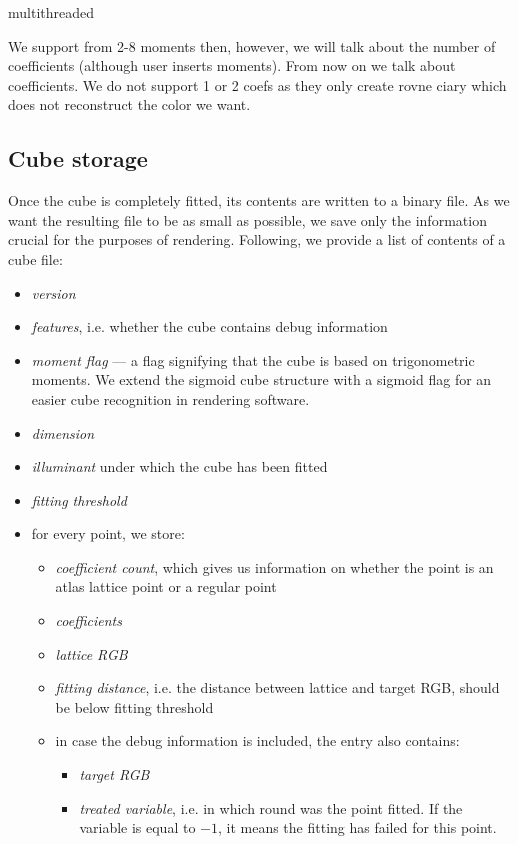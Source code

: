 multithreaded 

We support from 2-8 moments then, however, we will talk about the number of coefficients (although user inserts moments). From now on we talk about coefficients. We do not support 1 or 2 coefs as they only create rovne ciary which does not reconstruct the color we want.

\subsection{Cube storage}
	
Once the cube is completely fitted, its contents are written to a binary file. As we want the resulting file to be as small as possible, we save only the information crucial for the purposes of rendering. Following, we provide a list of contents of a cube file:
\begin{itemize}
	\item \emph{version}
	\item \emph{features}, i.e. whether the cube contains debug information
	\item \emph{moment flag} --- a flag signifying that the cube is based on trigonometric moments. We extend the sigmoid cube structure with a sigmoid flag for an easier cube recognition in rendering software.
	\item \emph{dimension}
	\item \emph{illuminant} under which the cube has been fitted
	\item \emph{fitting threshold}
	\item for every point, we store:
	\begin{itemize}
		\item \emph{coefficient count}, which gives us information on whether the point is an atlas lattice point or a regular point
		\item \emph{coefficients}
		\item \emph{lattice RGB}
		\item \emph{fitting distance}, i.e. the distance between lattice and target RGB, should be below fitting threshold
		\item in case the debug information is included, the entry also contains:
		\begin{itemize}
			\item \emph{target RGB}
			\item \emph{treated variable}, i.e. in which round was the point fitted. If the variable is equal to $-1$, it means the fitting has failed for this point.
		\end{itemize}
	\end{itemize}
\end{itemize}

